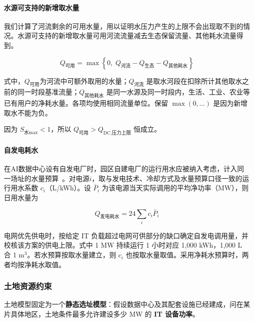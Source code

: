 \paragraph{水源可支持的新增取水量}\label{sec:water-avail}

我们计算了河流剩余的可用水量，用以证明水压力产生的上限不会出现取不到的情况。水源可支持的新增取水量可用河流流量减去生态保留流量、其他耗水流量得到。

\begin{equation}\label{eq:q1-qavail}
Q_{\text{可用}}
= \max\left\{0,\;
Q_{\text{河流}}-Q_{\text{生态}}-Q_{\text{其他耗水}}
\right\}
\end{equation}

式中，$Q_{\text{可用}}$为河流中可额外取用的水量；$Q_{\text{河流}}$ 是取水河段在扣除所计其他取水之前的同一时段基准流量；$Q_{\text{其他耗水}}$ 是同一水源及同一时段内，生活、工业、农业等已有用户的净耗水量。各项均使用相同流量单位。保留 $\max(0, \ldots)$ 是因为新增取水不能为负。\cite{q1bref02,q1bref03,q1bref08}

因为 $S_{\text{水}\max}<1$，所以 $Q_{\text{可用}}>Q_{\text{DC,压力上限}}$ 恒成立。

\paragraph{自发电耗水}\label{sec:water-gen}

在AI数据中心设有自发电厂时，园区自建电厂的运行用水应被纳入考虑，计入同一场址的水量预算~\cite{q1bref10}。对电源$i$，取与发电技术、冷却方式及水量预算口径一致的运行用水系数 $c_i$（L/kWh）。设 $\bar P_i$ 为该电源当天实际调用的平均净功率（MW），则日用水量为

\begin{equation}\label{eq:q1-qgen}
Q_{\text{发电耗水}}=24\sum_i c_i\bar P_i
\end{equation}

电网优先供电时，按给定 IT 负载超过电网可供部分的缺口确定自发电调用量，并校核该方案的供电上限。式中 1 MW 持续运行 1 小时对应 1,000 kWh，1,000 L 合 1 m$^3$。若水预算按取水量建立，则 $c_i$ 也按取水量取值。采用净耗水预算时，两者均按净耗水取值。

\subsubsection{土地资源约束}\label{sec:q1-land}

土地模型固定为一个\textbf{静态选址模型}：假设数据中心及其配套设施已经建成，问在某片具体地区，土地条件最多允许建设多少 MW 的 \textbf{IT 设备功率}。

